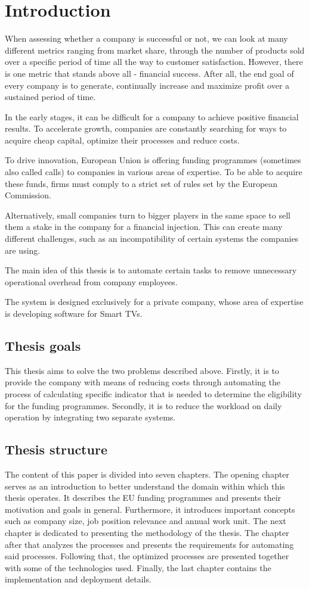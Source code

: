 \documentclass[12pt,oneside]{fithesis2}
\begin{document}
    \chapter{Introduction}
    When assessing whether a company is successful or not, we can look at many different metrics ranging from market share, through the number of products sold over a specific period of time all the way to customer satisfaction. However, there is one metric that stands above all - financial success. After all, the end goal of every company is to generate, continually increase and maximize profit over a sustained period of time.
    \par
    In the early stages, it can be difficult for a company to achieve positive financial results. To accelerate growth, companies are constantly searching for ways to acquire cheap capital, optimize their processes and reduce costs.
    \par
    To drive innovation, European Union is offering funding programmes (sometimes also called calls) to companies in various areas of expertise. To be able to acquire these funds, firms must comply to a strict set of rules set by the European Commission.
    \par
    Alternatively, small companies turn to bigger players in the same space to sell them a stake in the company for a financial injection. This can create many different challenges, such as an incompatibility of certain systems the companies are using.
    \par
    The main idea of this thesis is to automate certain tasks to remove unnecessary operational overhead from company employees.
    \par
    The system is designed exclusively for a private company, whose area of expertise is developing software for Smart TVs.
    \newpage
    \section{Thesis goals}
    This thesis aims to solve the two problems described above. Firstly, it is to provide the company with means of reducing costs through automating the process of calculating specific indicator that is needed to determine the eligibility for the funding programmes. Secondly, it is to reduce the workload on daily operation by integrating two separate systems.
    \section{Thesis structure}
    The content of this paper is divided into seven chapters. The opening chapter serves as an introduction to better understand the domain within which this thesis operates. It describes the EU funding programmes and presents their motivation and goals in general. Furthermore, it introduces important concepts such as company size, job position relevance and annual work unit. The next chapter is dedicated to presenting the methodology of the thesis. The chapter after that analyzes the processes and presents the requirements for automating said processes. Following that, the optimized processes are presented together with some of the technologies used. Finally, the last chapter contains the implementation and deployment details.
\end{document}
